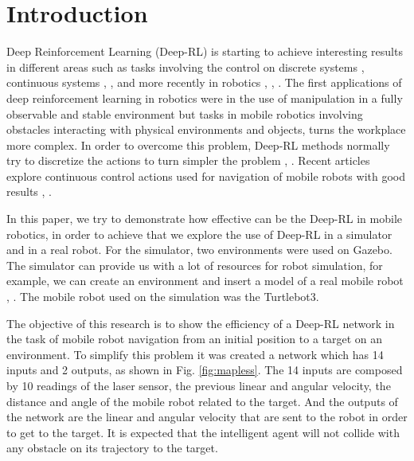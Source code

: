 \section{Introduction}

Deep Reinforcement Learning (Deep-RL) is starting to achieve interesting results in different areas such as tasks involving the control on discrete systems \cite{mnih2013playing}, \cite{schaul2015prioritized} continuous systems \cite{lillicrap2015continuous}, \cite{schulman2015high}, \cite{nachum2017trust}
and more recently in robotics \cite{gu2017deep}, \cite{mahmood2018benchmarking}, \cite{richter2019open}.
The first applications of deep reinforcement learning in robotics were in the use of manipulation in a  fully observable and stable environment \cite{gu2016continuous} but tasks in mobile robotics involving obstacles interacting with physical environments and objects, turns the workplace more complex.
In order to overcome this problem, Deep-RL methods normally try to discretize the actions to turn simpler the problem \cite{zhu2017target}, \cite{tai2016towards}.
Recent articles explore continuous control actions used for navigation of mobile robots with good results \cite{tai2017virtual}, \cite{chen2017socially}.

In this paper, we try to demonstrate how effective can be the Deep-RL in mobile robotics, in order to achieve that we explore the use of Deep-RL in a simulator and in a real robot.
For the simulator, two environments were used on Gazebo. 
The simulator can provide us with a lot of resources for robot simulation, for example, we can create an environment and insert a model of a real mobile robot \cite{fairchild2016ros}, \cite{joseph2015mastering}. 
The mobile robot used on the simulation was the Turtlebot3.

The objective of this research is to show the efficiency of a Deep-RL network in the task of mobile robot navigation from an initial position to a target on an environment.
To simplify this problem it was created a network which has 14 inputs and 2 outputs, as shown in Fig. \ref{fig:mapless}.
The 14 inputs are composed by 10 readings of the laser sensor, the previous linear and angular velocity, the distance and angle of the mobile robot related to the target.
And the outputs of the network are the linear and angular velocity that are sent to the robot in order to get to the target.
It is expected that the intelligent agent will not collide with any obstacle on its trajectory to the target.

